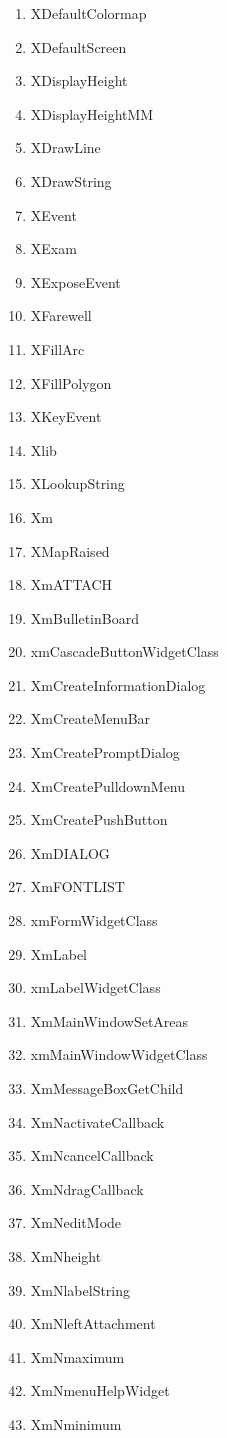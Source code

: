 \documentclass[twoside]{article}
\begin{document}
\begin{enumerate}
\begin{multicols}{2}
\begin{enumerate}
\item XDefaultColormap
\item XDefaultScreen
\item XDisplayHeight
\item XDisplayHeightMM
\item XDrawLine
\item XDrawString
\item XEvent
\item XExam
\item XExposeEvent
\item XFarewell
\item XFillArc
\item XFillPolygon
\item XKeyEvent
\item Xlib
\item XLookupString
\item Xm
\item XMapRaised
\item XmATTACH
\item XmBulletinBoard
\item xmCascadeButtonWidgetClass
\item XmCreateInformationDialog
\item XmCreateMenuBar
\item XmCreatePromptDialog
\item XmCreatePulldownMenu
\item XmCreatePushButton
\item XmDIALOG
\item XmFONTLIST
\item xmFormWidgetClass
\item XmLabel
\item xmLabelWidgetClass
\item XmMainWindowSetAreas
\item xmMainWindowWidgetClass
\item XmMessageBoxGetChild
\item XmNactivateCallback
\item XmNcancelCallback
\item XmNdragCallback
\item XmNeditMode
\item XmNheight
\item XmNlabelString
\item XmNleftAttachment
\item XmNmaximum
\item XmNmenuHelpWidget
\item XmNminimum

\end{enumerate}
\end{multicols}
\end{enumerate}
\end{document}

